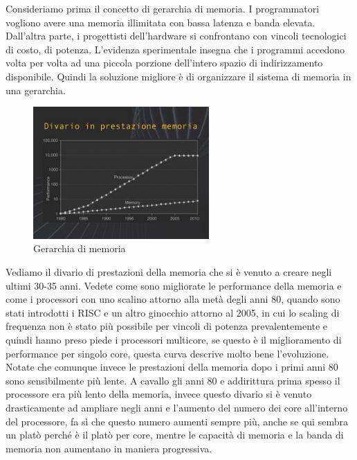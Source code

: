 Consideriamo prima il concetto di gerarchia di memoria.
I programmatori vogliono avere una memoria illimitata con bassa latenza e banda elevata.
Dall'altra parte, i progettisti dell'hardware si confrontano con vincoli tecnologici di costo, di potenza.
L'evidenza sperimentale insegna che i programmi accedono volta per volta ad una piccola porzione dell'intero spazio di indirizzamento disponibile.
Quindi la soluzione migliore è di organizzare il sistema di memoria in una gerarchia.

\FloatBarrier
\begin{figure}[H]
  \centering
  \includegraphics[width=0.60\textwidth,
                    trim=20 20 10 40, %
                    clip]
                    {images/Lez06_p01_fig_05.png}
  \caption{Gerarchia di memoria}
  \label{fig:Lez06_p01_fig_05}
\end{figure}
\FloatBarrier
\noindent

Vediamo il divario di prestazioni della memoria che si è venuto a creare negli ultimi 30-35 anni.
Vedete come sono migliorate le performance della memoria e come i processori con uno scalino attorno alla metà degli anni 80, quando sono stati introdotti i RISC e un altro ginocchio attorno al 2005, in cui lo scaling di frequenza non è stato più possibile per vincoli di potenza prevalentemente e quindi hanno preso piede i processori multicore, se questo è il miglioramento di performance per singolo core, questa curva descrive molto bene l'evoluzione.
Notate che comunque invece le prestazioni della memoria dopo i primi anni 80 sono sensibilmente più lente.
A cavallo gli anni 80 e addirittura prima spesso il processore era più lento della memoria, invece questo divario si è venuto drasticamente ad ampliare negli anni e l'aumento del numero dei core all'interno del processore, fa sì che questo numero aumenti sempre più, anche se qui sembra un platò perché è il platò per core, mentre le capacità di memoria e la banda di memoria non aumentano in maniera progressiva.


